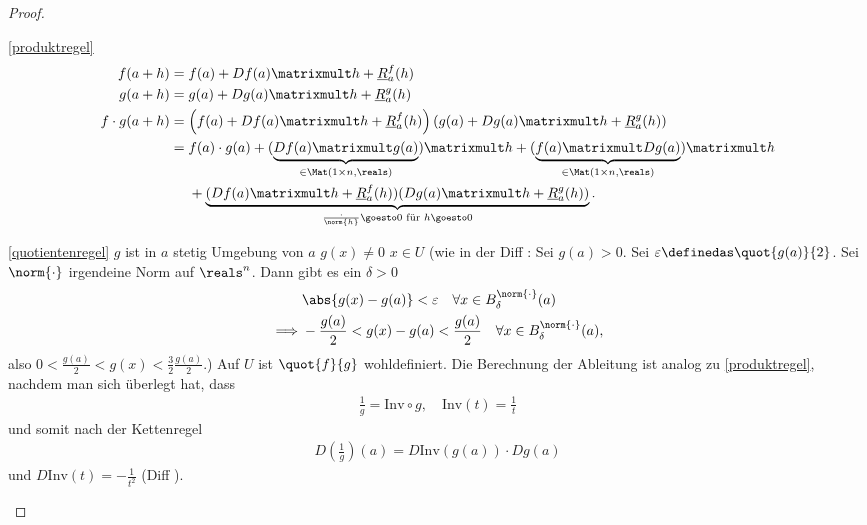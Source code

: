 \begin{proof}
    \begin{proofdescription}
        \item[\ref{produktregel}]
        \begin{align*}
            f(a+h)&=f(a)+Df(a)\matrixmult h+\underline{R}_{a}^f(h)\\
            g(a+h)&=g(a)+Dg(a)\matrixmult h+\underline{R}_{a}^g(h)\\
            f\cdot g(a+h)&\begin{aligned}[t]
                &=\left( f(a)+Df(a)\matrixmult h+\underline{R}_{a}^f(h) \right)\left( g(a)+Dg(a)\matrixmult h+\underline{R}_{a}^g(h) \right)\\
                &=\begin{aligned}[t]
                    &f(a)\cdot g(a)+(\underbrace{Df(a)\matrixmult g(a)}_{\in \Mat(1\times n,\reals)})\matrixmult h+(\underbrace{f(a)\matrixmult Dg(a)}_{\in \Mat(1\times n,\reals)})\matrixmult h\\
                    &+\underbrace{(Df(a)\matrixmult h+\underline{R}_a^f(h))(Dg(a)\matrixmult h+\underline{R}_a^g(h))}_{\frac{\cdot}{\norm{h}}\goesto 0 \text{ für }h\goesto 0}.
                \end{aligned}
            \end{aligned}            
        \end{align*}
        \item[\ref{quotientenregel}] \( g \) ist in \( a \) stetig \timplies \texists Umgebung von \( a \) \sd \( g(x)\neq 0 \) \tforall \( x\in U \) (wie in der Diff : Sei \obda \( g(a)>0 \). Sei \( \varepsilon\definedas \quot{g(a)}{2} \). Sei \( \norm{\cdot} \) irgendeine Norm auf \( \reals^n \). Dann gibt es ein \( \delta>0 \) \sd
        \begin{align*}
            &\abs{g(x)-g(a)}<\varepsilon\quad \forall x\in B_{\delta}^{\norm{\cdot}}(a)\\
            \implies &-\frac{g(a)}{2}<g(x)-g(a)<\frac{g(a)}{2}\quad \forall x\in B_{\delta}^{\norm{\cdot}}(a),
        \end{align*}
        also \( 0<\frac{g(a)}{2}<g(x)<\frac{3}{2}\frac{g(a)}{2} \).) \timplies Auf \( U \) ist \( \quot{f}{g} \) wohldefiniert. Die Berechnung der Ableitung ist analog zu \ref{produktregel}, nachdem man sich überlegt hat, dass
        \begin{align*}
            \frac{1}{g}=\text{Inv}\circ g,\quad \text{Inv}(t)=\frac{1}{t}
        \end{align*}
        und somit nach der Kettenregel
        \begin{align*}
            D\left( \frac{1}{g} \right)(a)=D \text{Inv}(g(a))\cdot Dg(a)
        \end{align*}
        und \( D \text{Inv}(t)=-\frac{1}{t^2} \) (Diff ).
    \end{proofdescription}    
\end{proof}
